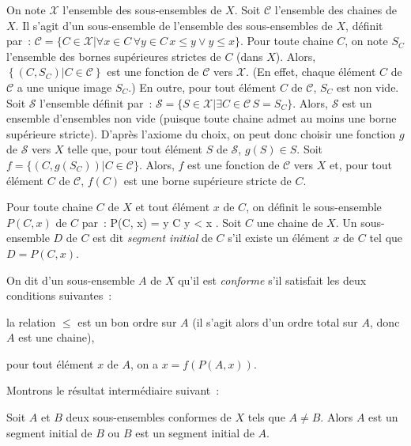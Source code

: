 On note $\mathcal{X}$ l'ensemble des sous-ensembles de $X$.
Soit $\mathcal{C}$ l'ensemble des chaines de $X$. 
Il s'agit d'un sous-ensemble de l'ensemble des sous-ensembles de $X$, définit par : $\mathcal{C} = \lbrace C \in \mathcal{X} \vert \forall x \in C \, \forall y \in C \, x \leq y \vee y \leq x \rbrace$.
Pour toute chaine $C$, on note $S_C$ l'ensemble des bornes supérieures strictes de $C$ (dans $X$). 
Alors, $\left\lbrace \left( C, S_C \right) \vert C \in \mathcal{C} \right\rbrace$ est une fonction de $\mathcal{C}$ vers $\mathcal{X}$. 
(En effet, chaque élément $C$ de $\mathcal{C}$ a une unique image $S_C$.)
En outre, pour tout élément $C$ de $\mathcal{C}$, $S_C$ est non vide. 
Soit $\mathcal{S}$ l'ensemble définit par : $\mathcal{S} = \lbrace S \in \mathcal{X} \vert \exists C \in \mathcal{C} \, S = S_C \rbrace$. 
Alors, $\mathcal{S}$ est un ensemble d'ensembles non vide (puisque toute chaine admet au moins une borne supérieure stricte). 
D'après l'axiome du choix, on peut donc choisir une fonction $g$ de $\mathcal{S}$ vers $X$ telle que, pour tout élément $S$
 de $\mathcal{S}$, $g(S) \in S$. 
Soit $f = \lbrace (C, g(S_C)) \vert C \in \mathcal{C} \rbrace$. 
Alors, $f$ est une fonction de $\mathcal{C}$ vers $X$ et, pour tout élément $C$ de $\mathcal{C}$, $f(C)$ est une borne supérieure stricte de $C$.

Pour toute chaine $C$ de $X$ et tout élément $x$ de $C$, on définit le sous-ensemble $P(C, x)$ de $C$ par : 
\startformula
    P(C, x) = \lbrace y \in C \vert y < x \rbrace.
\stopformula
Soit $C$ une chaine de $X$. 
Un sous-ensemble $D$ de $C$ est dit \emph{segment initial} de $C$ s'il existe un élément $x$ de $C$ tel que $D = P(C, x)$.

On dit d'un sous-ensemble $A$ de $X$ qu'il est \emph{conforme} s'il satisfait les deux conditions suivantes : 
\startitemize[nowhite]
    \item la relation $\leq$ est un bon ordre sur $A$ (il s'agit alors d'un ordre total sur $A$, donc $A$ est une chaine), 
    \item pour tout élément $x$ de $A$, on a $x = f(P(A,x))$. 
\stopitemize

Montrons le résultat intermédiaire suivant : 

\blank[medium]

\noindent{} Soit $A$ et $B$ deux sous-ensembles conformes de $X$ tels que $A \neq B$.
    Alors $A$ est un segment initial de $B$ ou $B$ est un segment initial de $A$.

\blank[medium]

